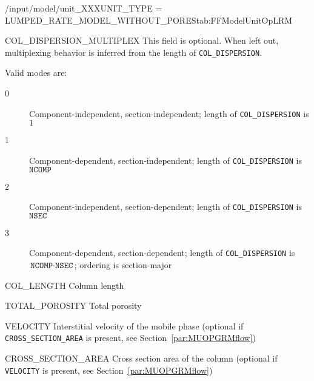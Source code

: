 \begin{condsubgroup}{/input/model/unit\_XXX}{UNIT\_TYPE = LUMPED\_RATE\_MODEL\_WITHOUT\_PORES}{tab:FFModelUnitOpLRM}
\begin{dataset}[unit=--,type=int,range={$\{0, \dots, 3 \}$},length={1}]{COL\_DISPERSION\_MULTIPLEX}
    This field is optional.
    When left out, multiplexing behavior is inferred from the length of \texttt{COL\_DISPERSION}.

    Valid modes are:
    \begin{description}
      \item[0] Component-independent, section-independent; length of \texttt{COL\_DISPERSION} is $1$
      \item[1] Component-dependent, section-independent; length of \texttt{COL\_DISPERSION} is $\texttt{NCOMP}$
      \item[2] Component-independent, section-dependent; length of \texttt{COL\_DISPERSION} is $\texttt{NSEC}$
      \item[3] Component-dependent, section-dependent; length of \texttt{COL\_DISPERSION} is $\texttt{NCOMP} \cdot \texttt{NSEC}$; ordering is section-major
    \end{description}\vspace{-\baselineskip}
  \end{dataset}
  \begin{dataset}[unit=\si{\metre},type=double,range={$> 0$},length={1}]{COL\_LENGTH}
    Column length
  \end{dataset}
  \begin{dataset}[unit=--,type=double,range={$[0,1]$},length={1}]{TOTAL\_POROSITY}
    Total porosity
  \end{dataset}
  \begin{dataset}[unit=\si{\metre\per\second},type=double,range={$\mathds{R}$},length={$1$ / \texttt{NSEC}}]{VELOCITY}
    Interstitial velocity of the mobile phase (optional if \texttt{CROSS\_SECTION\_AREA} is present, see Section~\ref{par:MUOPGRMflow})
  \end{dataset}
  \begin{dataset}[unit=\si{\square\metre},type=double,range={$>0$},length={1}]{CROSS\_SECTION\_AREA}
    Cross section area of the column (optional if \texttt{VELOCITY} is present, see Section~\ref{par:MUOPGRMflow})
  \end{dataset}
\end{condsubgroup}

